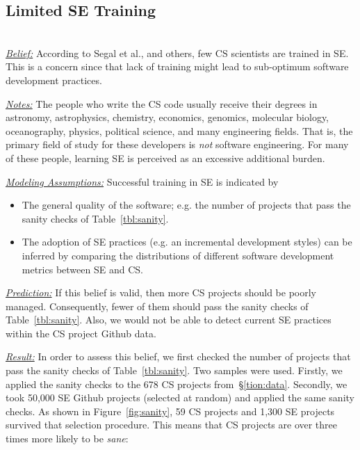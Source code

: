 \documentclass[sigconf,review,anonymous]{acmart}
\newcommand{\bi}{\begin{itemize}}
\newcommand{\ei}{\end{itemize}}
\begin{document}
  








\subsection{Limited SE Training} ~\\
\noindent \textit{\underline{Belief:}} According to Segal et al.,
and others\cite{segal07_enduser, basili08_hpc, carver13_perception, easterbrook_cs, sanders08_risk}, few CS scientists are trained in SE.
This is a concern since that lack of training might lead to sub-optimum software
development practices.

\noindent \textit{\underline{Notes:}} 
The people who write the CS code usually
receive their degrees in
astronomy, astrophysics, chemistry, economics, genomics, molecular biology, oceanography, physics, political science, and many engineering fields.
That is, the primary field of study for these developers is {\em not}
software engineering. For many of these people,
learning SE is perceived as an excessive additional burden\cite{boyle09_lessons}. 

\noindent \textit{\underline{Modeling Assumptions:}} 
Successful training in SE is indicated by
\bi
\item The general quality of the software; e.g. the number of projects that pass the sanity checks of Table~\ref{tbl:sanity}.
\item The adoption of SE practices (e.g. an incremental development styles) can be inferred by comparing the distributions of different software development metrics between SE and CS.
\ei

\noindent \textit{\underline{Prediction:}} If this belief is valid, then more CS
projects should be poorly managed. Consequently, fewer of them should
pass the sanity checks of Table~\ref{tbl:sanity}.
Also, we would not be able to detect current SE  practices within the CS project Github data.

\noindent \textit{\underline{Result:}} In order to assess this belief, we first checked the number of projects that pass the sanity checks of Table~\ref{tbl:sanity}.
Two samples were used. Firstly, we applied the sanity checks to the 678 CS projects from~\S\ref{tion:data}.
Secondly, we took 50,000 SE Github projects (selected at random) and applied
the same sanity checks. As shown in Figure~\ref{fig:sanity},  59 CS projects and 1,300 SE projects
survived that selection procedure. This means that CS projects are over three times more likely to be {\em sane}: 
\end{document}

